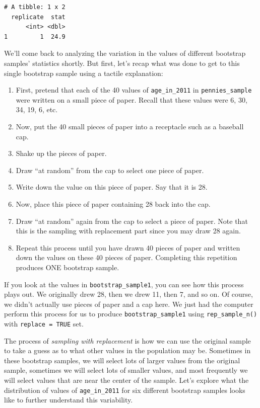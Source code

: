 \documentclass[]{article}
\providecommand{\tightlist}{%
  \setlength{\itemsep}{0pt}\setlength{\parskip}{0pt}}
\begin{document}
\begin{verbatim}
# A tibble: 1 x 2
  replicate  stat
      <int> <dbl>
1         1  24.9
\end{verbatim}

We'll come back to analyzing the variation in the values of different
bootstrap samples' statistics shortly. But first, let's recap what was
done to get to this single bootstrap sample using a tactile explanation:

\begin{enumerate}
\def\labelenumi{\arabic{enumi}.}
\tightlist
\item
  First, pretend that each of the 40 values of \texttt{age\_in\_2011} in
  \texttt{pennies\_sample} were written on a small piece of paper.
  Recall that these values were 6, 30, 34, 19, 6, etc.
\item
  Now, put the 40 small pieces of paper into a receptacle such as a
  baseball cap.
\item
  Shake up the pieces of paper.
\item
  Draw ``at random'' from the cap to select one piece of paper.
\item
  Write down the value on this piece of paper. Say that it is 28.
\item
  Now, place this piece of paper containing 28 back into the cap.
\item
  Draw ``at random'' again from the cap to select a piece of paper. Note
  that this is the sampling with replacement part since you may draw 28
  again.
\item
  Repeat this process until you have drawn 40 pieces of paper and
  written down the values on these 40 pieces of paper. Completing this
  repetition produces ONE bootstrap sample.
\end{enumerate}

If you look at the values in \texttt{bootstrap\_sample1}, you can see
how this process plays out. We originally drew 28, then we drew 11, then
7, and so on. Of course, we didn't actually use pieces of paper and a
cap here. We just had the computer perform this process for us to
produce \texttt{bootstrap\_sample1} using \texttt{rep\_sample\_n()} with
\texttt{replace\ =\ TRUE} set.

The process of \emph{sampling with replacement} is how we can use the
original sample to take a guess as to what other values in the
population may be. Sometimes in these bootstrap samples, we will select
lots of larger values from the original sample, sometimes we will select
lots of smaller values, and most frequently we will select values that
are near the center of the sample. Let's explore what the distribution
of values of \texttt{age\_in\_2011} for six different bootstrap samples
looks like to further understand this variability.
\end{document}
